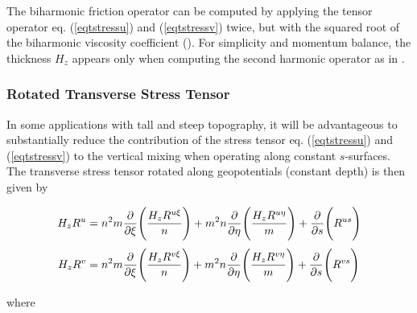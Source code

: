 The biharmonic friction operator can be computed by applying the tensor
operator eq. (\ref{eqtstressu}) and (\ref{eqtstressv}) twice, but with
the squared root of the biharmonic viscosity coefficient
(\cite{Griffies_2000}).  For simplicity and momentum
balance, the thickness $H_{z}$ appears only when computing the second
harmonic operator as in \cite{Griffies_2000}.

\subsubsection{Rotated Transverse Stress Tensor}

In some applications with tall and steep topography, it
will be advantageous to substantially reduce the contribution of the
stress tensor eq. (\ref{eqtstressu}) and (\ref{eqtstressv}) to
the vertical mixing when operating along constant $s$-surfaces.
The transverse stress tensor rotated along geopotentials (constant depth)
is then given by

\begin{align}
      H_{z}R^{u} &= {n^2}m {\pder{}{\xi}}  \Biggl(
\frac{H_{z}R^{u\xi}} {n} \Biggr) +
                    {m^2}n {\pder{}{\eta}} \Biggl(
\frac{H_{z}R^{u\eta}}{m} \Biggr) +
                           {\pder{}{s}}    \Biggl( R^{us} \Biggr)
\label{eqrstressu}
\\
   \noalign{\smallskip}
      H_{z}R^{v} &= {n^2}m {\pder{}{\xi}}  \Biggl(
\frac{H_{z}R^{v\xi}} {n} \Biggr) +
                    {m^2}n {\pder{}{\eta}} \Biggl(
\frac{H_{z}R^{v\eta}}{m} \Biggr) +
                           {\pder{}{s}}    \Biggl( R^{vs} \Biggr)
\label{eqrstressv}
\end{align}

where

